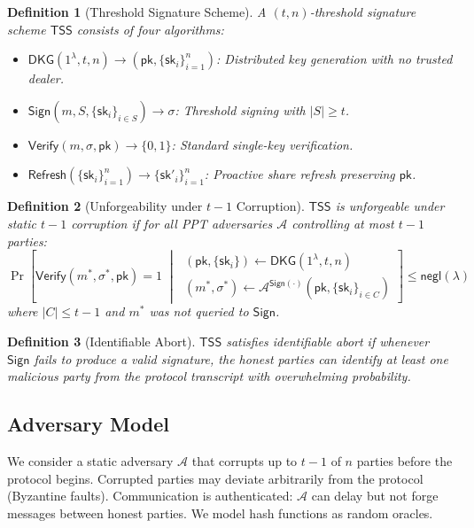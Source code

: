\documentclass[11pt,twocolumn]{article}
\newtheorem{definition}{Definition}[section]
\begin{document}
\begin{definition}[Threshold Signature Scheme]
\label{def:tss}
A $(t,n)$-threshold signature scheme $\mathsf{TSS}$ consists of four algorithms:
\begin{itemize}[nosep]
  \item $\mathsf{DKG}(1^\lambda, t, n) \to (\mathsf{pk}, \{\mathsf{sk}_i\}_{i=1}^n)$:
    Distributed key generation with no trusted dealer.
  \item $\mathsf{Sign}(m, S, \{\mathsf{sk}_i\}_{i \in S}) \to \sigma$: Threshold
    signing with $|S| \geq t$.
  \item $\mathsf{Verify}(m, \sigma, \mathsf{pk}) \to \{0,1\}$: Standard single-key
    verification.
  \item $\mathsf{Refresh}(\{\mathsf{sk}_i\}_{i=1}^n) \to \{\mathsf{sk}'_i\}_{i=1}^n$:
    Proactive share refresh preserving $\mathsf{pk}$.
\end{itemize}
\end{definition}

\begin{definition}[Unforgeability under $t{-}1$ Corruption]
\label{def:uf}
$\mathsf{TSS}$ is unforgeable under static $t{-}1$ corruption if for all PPT
adversaries $\mathcal{A}$ controlling at most $t-1$ parties:
\[
  \Pr\!\left[
    \mathsf{Verify}(m^*, \sigma^*, \mathsf{pk}) = 1
    \;\middle|\;
    \begin{array}{l}
      (\mathsf{pk}, \{\mathsf{sk}_i\}) \gets \mathsf{DKG}(1^\lambda, t, n) \\
      (m^*, \sigma^*) \gets \mathcal{A}^{\mathsf{Sign}(\cdot)}(\mathsf{pk}, \{\mathsf{sk}_i\}_{i \in C})
    \end{array}
  \right] \leq \mathsf{negl}(\lambda)
\]
where $|C| \leq t-1$ and $m^*$ was not queried to $\mathsf{Sign}$.
\end{definition}

\begin{definition}[Identifiable Abort]
\label{def:id-abort}
$\mathsf{TSS}$ satisfies identifiable abort if whenever $\mathsf{Sign}$ fails to
produce a valid signature, the honest parties can identify at least one malicious
party from the protocol transcript with overwhelming probability.
\end{definition}

\subsection{Adversary Model}

We consider a static adversary $\mathcal{A}$ that corrupts up to $t-1$ of $n$
parties before the protocol begins. Corrupted parties may deviate arbitrarily from the
protocol (Byzantine faults). Communication is authenticated: $\mathcal{A}$ can delay
but not forge messages between honest parties. We model hash functions as random
oracles.
\end{document}
